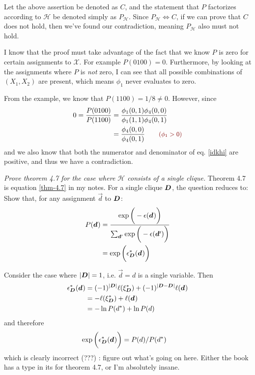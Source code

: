 \documentclass[11pt]{article}
\begin{document}
\begin{example}[Exercise 4.1]
\begin{compactitem}
\begin{compactenum}
			Let the above assertion be denoted as $C$, and the statement that $P$ factorizes according to $\mathcal{H}$ be denoted simply as $P_{\mathcal H}$. Since $P_{\mathcal H} \iff C$, if we can prove that $C$ does not hold, then we've found our contradiction, meaning $P_{\mathcal{H}}$ also must not hold.
			
			\item I know that the proof must take advantage of the fact that we know $P$ is zero for certain assignments to $\mathcal{X}$. For example $P(0100) = 0$. Furthermore, by looking at the assignments where $P$ is \textit{not} zero, I can see that all possible combinations of $(X_1, X_2)$ are present, which means $\phi_1$ never evaluates to zero.
			
			\item From the example, we know that $P(1100) = 1/8 \ne 0$. However, since
			\begin{align}
				0 = \frac{P(0100)}{P(1100)} &= \frac{\phi_1(0, 1)\phi_4(0, 0)}{\phi_1(1, 1)\phi_4(0, 1)} \\
			   &= \frac{\phi_4(0, 0)}{\phi_4(0, 1)} \qquad \mred{(\phi_1 > 0)} \label{idkhi}
			\end{align}
			and we also know that both the numerator and denominator of eq. \ref{idkhi} are positive, and thus we have a contradiction. 
		\end{compactenum}
	\end{compactitem}
\end{example}

\begin{example}[Exercise 4.4]
\textit{Prove theorem 4.7 for the case where $\mathcal H$ consists of a single clique.} Theorem 4.7 is equation \ref{thm-4.7} in my notes. For a single clique $\bm{D}_{}$, the question reduces to: Show that, for any assignment $\vec d$ to $\bm{D}_{}$:
\begin{align}
	P(\bm{d}_{})
	&=  \frac{\exp\bigg( -\epsilon(\bm{d}_{})   \bigg)   }{   \sum_{\bm{d}_{}'} \exp\bigg( -\epsilon(\bm{d}_{}')   \bigg)   }    \\
	&= \exp\bigg( \epsilon^*_{\bm{D}_{}} ( \bm{d}_{} )  \bigg)
\end{align}

Consider the case where $|\bm{D}_{}|= 1$, i.e. $\vec d = d$ is a single variable. Then
\begin{align}
	\epsilon^*_{\bm{D}_{}}(\bm{d}_{}) 
	&= (-1)^{|\bm{D}_{}|} \ell(\xi^*_{\bm{D}_{}}) + (-1)^{|\bm{D}_{} - \bm{D}_{}|}\ell(\bm{d}_{}) \\
	&= -\ell(\xi^*_{\bm{D}_{}}) + \ell(\bm{d}_{}) \\
	&= -\ln P(d^*) + \ln P(d)
\end{align}
and therefore
\begin{align}
	 \exp\bigg( \epsilon^*_{\bm{D}_{}} ( \bm{d}_{} )  \bigg)
	 &= P(d) / P(d^*)
\end{align}
which is clearly incorrect (???) : figure out what's going on here. Either the book has a type in its for theorem 4.7, or I'm absolutely insane. 
\end{example}
\end{document}
